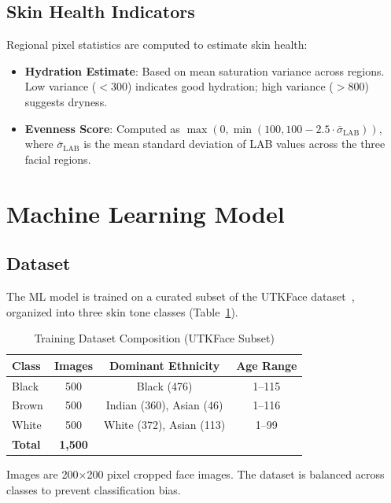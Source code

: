 \documentclass[conference]{IEEEtran}
\begin{document}
\subsection{Skin Health Indicators}

Regional pixel statistics are computed to estimate skin health:

\begin{itemize}
    \item \textbf{Hydration Estimate}: Based on mean saturation variance across regions. Low variance ($< 300$) indicates good hydration; high variance ($> 800$) suggests dryness.
    \item \textbf{Evenness Score}: Computed as $\max(0, \min(100, 100 - 2.5 \cdot \bar{\sigma}_{\text{LAB}}))$, where $\bar{\sigma}_{\text{LAB}}$ is the mean standard deviation of LAB values across the three facial regions.
\end{itemize}

\section{Machine Learning Model}

\subsection{Dataset}

The ML model is trained on a curated subset of the UTKFace dataset~\cite{utkface}, organized into three skin tone classes (Table~\ref{tab:dataset}).

\begin{table}[t]
\centering
\caption{Training Dataset Composition (UTKFace Subset)}
\label{tab:dataset}
\begin{tabular}{lccc}
\toprule
\textbf{Class} & \textbf{Images} & \textbf{Dominant Ethnicity} & \textbf{Age Range} \\
\midrule
Black & 500 & Black (476) & 1--115 \\
Brown & 500 & Indian (360), Asian (46) & 1--116 \\
White & 500 & White (372), Asian (113) & 1--99 \\
\midrule
\textbf{Total} & \textbf{1,500} & & \\
\bottomrule
\end{tabular}
\end{table}

Images are 200$\times$200 pixel cropped face images. The dataset is balanced across classes to prevent classification bias.
\end{document}
